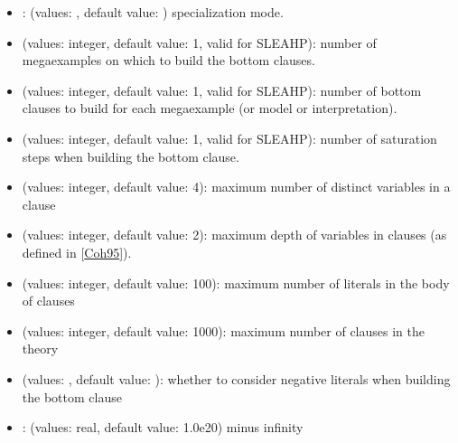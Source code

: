 \documentclass[letterpaper,10pt,english]{sphinxmanual}
\begin{document}
\begin{itemize}
\item {} 
\sphinxAtStartPar
{}: (values: , default value: ) specialization mode.

\item {} 
\sphinxAtStartPar
{} (values: integer, default value: 1, valid for SLEAHP): number of mega\sphinxhyphen{}examples on which to build the bottom clauses.

\item {} 
\sphinxAtStartPar
{} (values: integer, default value: 1, valid for SLEAHP): number of bottom clauses to build for each mega\sphinxhyphen{}example (or model or interpretation).

\item {} 
\sphinxAtStartPar
{} (values: integer, default value: 1, valid for SLEAHP): number of saturation steps when building the bottom clause.

\item {} 
\sphinxAtStartPar
{} (values: integer, default value: 4): maximum number of distinct variables in a clause

\item {} 
\sphinxAtStartPar
{} (values: integer, default value: 2): maximum depth of variables in clauses (as defined in {[}\hyperlink{cite.index:id23}{Coh95}{]}).

\item {} 
\sphinxAtStartPar
{} (values: integer, default value: 100): maximum number of literals in the body of clauses

\item {} 
\sphinxAtStartPar
{} (values: integer, default value: 1000): maximum number of clauses in the theory

\item {} 
\sphinxAtStartPar
{} (values: , default value: ): whether to consider negative literals when building the bottom clause

\item {} 
\sphinxAtStartPar
{}: (values: real, default value: \sphinxhyphen{}1.0e20) minus infinity


\end{itemize}
\end{document}
